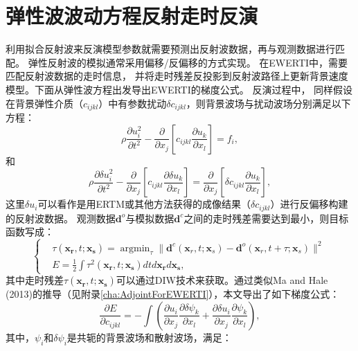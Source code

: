 \section{弹性波波动方程反射走时反演}
利用拟合反射波来反演模型参数就需要预测出反射波数据，再与观测数据进行匹配。
弹性反射波的模拟通常采用偏移/反偏移的方式实现。
在EWERTI中，需要匹配反射波数据的走时信息，
并将走时残差反投影到反射波路径上更新背景速度模型。下面从弹性波方程出发导出EWERTI的梯度公式。
反演过程中，
同样假设在背景弹性介质（$c_{ijkl}$）中有参数扰动$\delta c_{ijkl}$，则背景波场与扰动波场分别满足以下方程：
\begin{equation}
    \rho \frac{\partial u^2_i}{\partial t^2}  -
    \frac{\partial}{\partial x_j}\left[ 
        c_{ijkl}\frac{\partial u_{k}}{\partial
        x_l}\right]=f_i,
    \label{eq:WE_3} 
\end{equation}
和
\begin{equation}
    \rho \frac{\partial \delta u^2_i}{\partial t^2}  -
    \frac{\partial}{\partial x_j}\left[ 
        c_{ijkl}\frac{\partial \delta u_{k}}{\partial
        x_l}\right]=\frac{\partial}{\partial x_j}\left[\delta c_{ijkl}\frac{\partial u_{k}}{\partial x_l}\right],
    \label{eq:DeltaWE} 
\end{equation}
这里$\delta u_i$可以看作是用ERTM或其他方法获得的成像结果（$\delta c_{ijkl}$）进行反偏移构建的反射波数据。
观测数据$\mathbf{d}^{o}$与模拟数据$\mathbf{d}^{c}$之间的走时残差需要达到最小，则目标函数写成：
\begin{equation}
	\left\{
		\begin{aligned}
			&\tau(\mathbf{x_r},t;\mathbf{x_s})=\mathop{\arg\min}_{\tau}
			\parallel\mathbf{d}^{c}(\mathbf{x}_r,t;\mathbf{x}_s)-\mathbf{d}^{o}(\mathbf{x}_r,t+\tau;\mathbf{x}_s)\parallel^2\\
    &E=\frac{1}{2}\int\tau^2(\mathbf{x_r},t;\mathbf{x_s})dtd\mathbf{x_r}d\mathbf{x_s},
		\end{aligned}
	\right.
    \label{eq:Objectivefunction} 
\end{equation}
其中走时残差$\tau(\mathbf{x_r},t;\mathbf{x_s})$可以通过DIW技术来获取。通过类似Ma and
Hale (2013)\cite{ma2013}的推导（见附录\ref{cha:AdjointForEWERTI}），本文导出了如下梯度公式：
\begin{equation}
    \frac{\partial E}{\partial c_{ijkl}}=-\int (\frac{\partial u_{i}}{\partial
    x_j}\frac{\partial \delta \psi_{k}}{\partial x_l}+\frac{\partial \delta u_{i}}{\partial
    x_j}\frac{\partial \psi_{k}}{\partial x_l}),
    \label{eq:GradientCijkl}
\end{equation}
其中，$\psi_i$和$\delta \psi_i$是共轭的背景波场和散射波场，满足：
